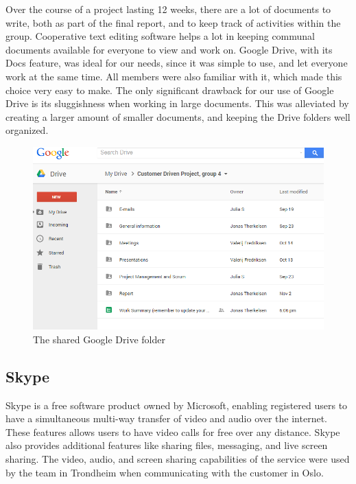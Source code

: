 Over the course of a project lasting 12 weeks, there are a lot of documents to write, both as part of the final report, and to keep track of activities within the group. Cooperative text editing software helps a lot in keeping communal documents available for everyone to view and work on. Google Drive, with its Docs feature, was ideal for our needs, since it was simple to use, and let everyone work at the same time. All members were also familiar with it, which made this choice very easy to make. The only significant drawback for our use of Google Drive is its sluggishness when working in large documents. This was alleviated by creating a larger amount of smaller documents, and keeping the Drive folders well organized.

\begin{figure}[ht!]
  \centering
  \includegraphics[width=\linewidth]{./Planning/img/Drive}
  \caption{The shared Google Drive folder}
  \label{fig:PlanningSoftwareDevDriveFolder}
\end{figure}

\subsection{Skype}
\label{subsec:PlanningSoftwareDevSkype}
Skype is a free software product owned by Microsoft, enabling registered users to have a simultaneous multi-way transfer of video and audio over the internet. These features allows users to have video calls for free over any distance. Skype also provides additional features like sharing files, messaging, and live screen sharing. The video, audio, and screen sharing capabilities of the service were used by the team in Trondheim when communicating with the customer in Oslo.

